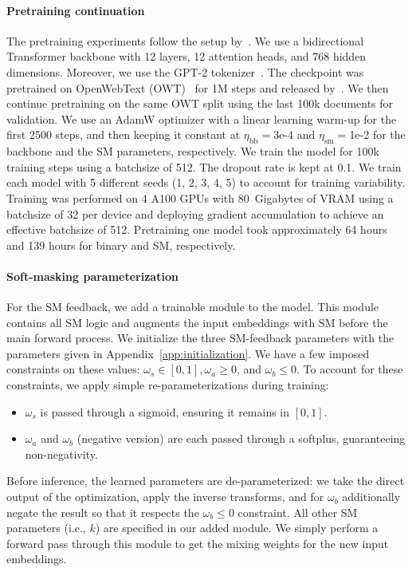 \documentclass{article}
\begin{document}
\paragraph{Pretraining continuation}
The pretraining experiments follow the setup by~\cite{sahoo_simple_2024}. 
We use a bidirectional Transformer backbone with 12 layers, 12 attention heads, and 768 hidden dimensions. 
% 
Moreover, we use the GPT-2 tokenizer~\citep{radford_2019_gpt2}. 
%
The checkpoint was pretrained on OpenWebText (OWT)~\citep{Gokaslan2019OpenWeb} for 1M steps and released by~\cite{sahoo_simple_2024}. 
% 
We then continue pretraining on the same OWT split using the last 100k documents for validation.
% 
We use an AdamW optimizer with a linear learning warm-up for the first 2500 steps, and then keeping it constant at $\eta_{\text{bb}}=$3e-4 and $\eta_{\text{sm}}=$1e-2 for the backbone and the SM parameters, respectively. 
% 
We train the model for 100k training steps using a batchsize of 512. 
% 
The dropout rate is kept at 0.1. 
% 
We train each model with 5 different seeds (1, 2, 3, 4, 5) to account for training variability. 
%
Training was performed on 4 A100 GPUs with 80~Gigabytes of VRAM using a batchsize of 32 per device and deploying gradient accumulation to achieve an effective batchsize of 512. 
%
Pretraining one model took approximately 64 hours and 139 hours for binary and SM, respectively. 

\paragraph{Soft-masking parameterization}
\label{app:parameterization}For the SM feedback, we add a trainable module to the model. 
%
This module contains all SM logic and augments the input embeddings with SM before the main forward process. 
%
We initialize the three SM-feedback parameters with the parameters given in Appendix~\ref{app:initialization}.
%
We have a few imposed constraints on these values: $\omega_s \in [0,1], \omega_a \geq 0$, and $\omega_b \leq 0$.
%
To account for these constraints, we apply simple re-parameterizations during training:
\begin{itemize}
    \item $\omega_s$ is passed through a sigmoid, ensuring it remains in $[0,1]$.
    \item $\omega_a$ and $\omega_b$ (negative version) are each passed through a softplus, guaranteeing non-negativity.
\end{itemize}
Before inference, the learned parameters are de-parameterized: we take the direct output of the optimization, apply the inverse transforms, and for $\omega_b$ additionally negate the result so that it respects the $\omega_b \leq 0$ constraint.
%
All other SM parameters (i.e., $k$) are specified in our added module. 
%
We simply perform a forward pass through this module to get the mixing weights for the new input embeddings.  
\end{document}
